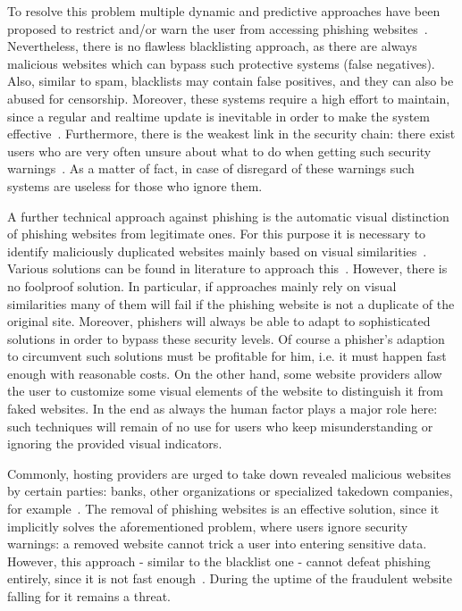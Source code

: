 \begin{description}[leftmargin=0cm]
 To resolve this problem multiple dynamic and predictive approaches have been proposed to restrict and/or warn the user from accessing phishing websites~\cite{prakash2010phishnet, obied2009fraudulent, balzarotti2012proactive}. Nevertheless, there is no flawless blacklisting approach, as there are always malicious websites which can bypass such protective systems (false negatives). Also, similar to spam, blacklists may contain false positives, and they can also be abused for censorship.
 Moreover, these systems require a high effort to maintain, since a regular and realtime update is inevitable in order to make the system effective~\cite{purkait2012phishing}. Furthermore, there is the weakest link in the security chain: there exist users who are very often unsure about what to do when getting such security warnings~\cite{bakhshi2009social}. As a matter of fact, in case of disregard of these warnings such systems are useless for those who ignore them. 
	\item[Visual distinction] A further technical approach against phishing is the automatic visual distinction of phishing websites from legitimate ones.
 For this purpose it is necessary to identify maliciously duplicated websites mainly based on visual similarities~\cite{liu2006antiphishing}. Various solutions can be found in literature to approach this~\cite{chen2009fighting,chen2010detecting,zhang2011textual}. However, there is no foolproof solution.
 In particular, if approaches mainly rely on visual similarities many of them will fail if the phishing website is not a duplicate of the original site.
 Moreover, phishers will always be able to adapt to sophisticated solutions in order to bypass these security levels. 
Of course a phisher's adaption to circumvent such solutions must be profitable for him, i.e. it must happen fast enough with reasonable costs.
On the other hand, some website providers allow the user to customize some visual elements of the website to distinguish it from faked websites.
In the end as always the human factor plays a major role here: such techniques will remain of no use for users who keep misunderstanding or ignoring the provided visual indicators.

	\item[Takedown] Commonly, hosting providers are urged to take down revealed malicious websites by certain parties: banks, other organizations or specialized takedown companies, for example~\cite{moore2007examining}. The removal of phishing websites is an effective solution, since it implicitly solves the aforementioned problem, where users ignore security warnings: a removed website cannot trick a user into entering sensitive data.
 However, this approach - similar to the blacklist one - cannot defeat phishing entirely, since it is not fast enough~\cite{moore2007examining}. During the uptime of the fraudulent website falling for it remains a threat.

\end{description}

